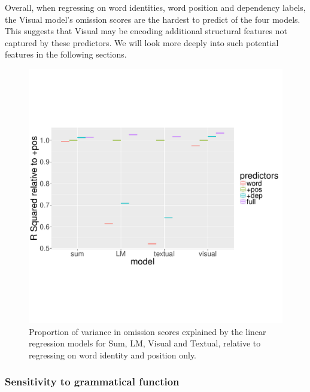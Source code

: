 Overall, when regressing on word identities, word position and
dependency labels, the {\sc Visual} model's omission scores are the
hardest to predict of the four models. This suggests that {\sc Visual} may be
encoding additional structural features not captured by these predictors.
We will look more deeply into such potential features in the following sections.

\begin{figure}
\centering
  \includegraphics[scale=0.35]{chapters/COLI/position-new.pdf}
\caption{Proportion of variance in omission scores explained by the
  linear regression models
 for {\sc Sum}, {\sc LM}, {\sc Visual} and {\sc Textual}, relative to
 regressing on word identity and position only. }
\label{fig:rsquared}
\end{figure}


\subsubsection{Sensitivity to grammatical function}
\label{sec:gramfunc}

